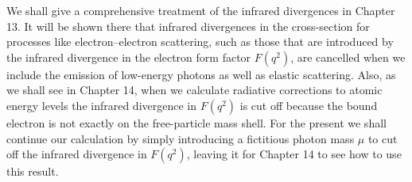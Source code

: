 We shall give a comprehensive treatment of the infrared divergences in
Chapter 13. It will be shown there that infrared divergences in the
cross-section for processes like electron--electron scattering, such as those
that are introduced by the infrared divergence in the electron form factor
$F(q^2)$, are cancelled when we include the emission of low-energy photons as
well as elastic scattering. Also, as we shall see in Chapter 14, when we
calculate radiative corrections to atomic energy levels the infrared
divergence in $F(q^2)$ is cut off because the bound electron is not exactly on
the free-particle mass shell. For the present we shall continue our
calculation by simply introducing a fictitious photon mass $\mu$ to cut off
the infrared divergence in $F(q^2)$, leaving it for Chapter 14 to see how to
use this result.

